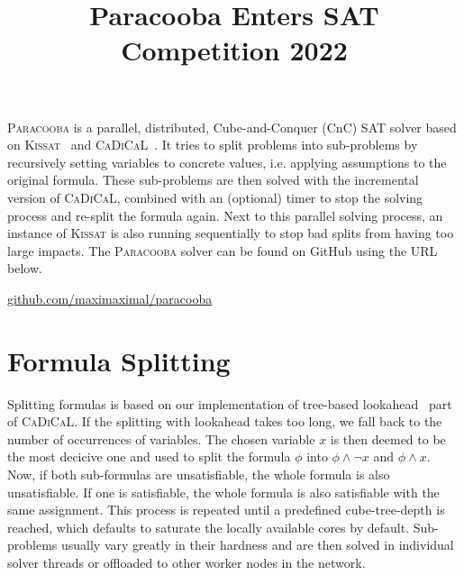 \documentclass[conference]{IEEEtran}
\newcommand{\paracooba}{\textsc{Paracooba}}
\newcommand{\kissat}{\textsc{Kissat}}
\newcommand{\cadical}{\textsc{CaDiCaL}}
\begin{document}
\title{Paracooba Enters SAT Competition 2022}

\author{
\and
{}
\and
{}
}

\maketitle

\paracooba{} is a parallel, distributed, Cube-and-Conquer (CnC) SAT solver based on
\kissat{}~\cite{kissatsat2020} and \cadical~\cite{cadical}. It tries to split problems into
sub-problems by recursively setting variables to concrete values, i.e. applying assumptions to the
original formula. These sub-problems are then solved with the incremental version of \cadical{},
combined with an (optional) timer to stop the solving process and re-split the formula again. Next
to this parallel solving process, an instance of \kissat{} is also running sequentially to stop bad
splits from having too large impacts. The \paracooba{} solver can be found on GitHub using the URL
below.

\begin{center}
\href{https://github.com/maximaximal/paracooba}{github.com/maximaximal/paracooba}
\end{center}

\section{Formula Splitting}

Splitting formulas is based on our implementation of tree-based lookahead~\cite{treelook} part of
\cadical{}. If the splitting with lookahead takes too long, we fall back to the number of
occurrences of variables. The chosen variable $x$ is then deemed to be the most decicive one and
used to split the formula $\phi$ into $\phi \wedge \neg x$ and $\phi \wedge x$. Now, if both
sub-formulas are unsatisfiable, the whole formula is also unsatisfiable. If one is satisfiable, the
whole formula is also satisfiable with the same assignment. This process is repeated until a
predefined cube-tree-depth is reached, which defaults to saturate the locally available cores by
default. Sub-problems usually vary greatly in their hardness and are then solved in individual
solver threads or offloaded to other worker nodes in the network.
\end{document}
